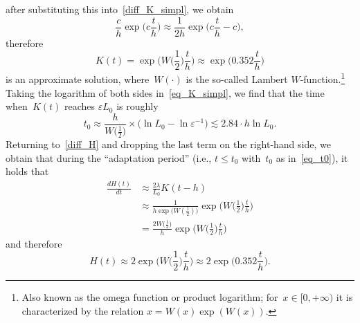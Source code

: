 \documentclass[12pt]{article}
\newcommand{\eps}{\varepsilon}
\begin{document}
after substituting this into~\eqref{diff_K_simpl},
we obtain
\[
 \frac{c}{h}\exp\Big(c\frac{t}{h}\Big) 
   \approx \frac{1}{2h}\exp\Big(c\frac{t}{h}-c\Big),
\]
therefore 
\begin{equation}
\label{eq_K_simpl}
K(t)=\exp\Big(W\big({\textstyle\frac{1}{2}}\big)\frac{t}{h}\Big)
    \approx \exp\Big(0.352\frac{t}{h}\Big)
\end{equation}
is an approximate solution, where~$W(\cdot)$ is the so-called
Lambert $W$-function.\footnote{Also known as
 the omega function or product logarithm; for~$x\in [0,+\infty)$
it is characterized by the relation $x=W(x)\exp(W(x))$.}
Taking the logarithm of both sides in~\eqref{eq_K_simpl}, we find that
the time when~$K(t)$ reaches $\eps L_0$ is roughly
\begin{equation}
 \label{eq_t0}
 t_0 \approx \frac{h}{W\big({\textstyle\frac{1}{2}}\big)} 
\times \big(\ln L_0 - \ln \eps^{-1}\big)
\lesssim 2.84 \cdot h  \ln L_0.
\end{equation}
Returning to~\eqref{diff_H} and 
dropping the last term on the right-hand side, we
obtain that during the ``adaptation period'' (i.e., $t\leq t_0$
with~$t_0$ as in~\eqref{eq_t0}), it holds that
\begin{align*}
 \frac{d H(t)}{dt} &\approx \frac{2\lambda}
{L_0}K(t-h)
  \\
&\approx \frac{1}{h\exp\big(W(\frac{1}{2})\big)}
\exp\Big(W\big({\textstyle\frac{1}{2}}\big)\frac{t}{h}\Big)
\\
&= \frac{2W\big({\textstyle\frac{1}{2}}\big)}{h}
\exp\Big(W\big({\textstyle\frac{1}{2}}\big)\frac{t}{h}\Big)
\end{align*}
and therefore
\begin{equation}
\label{eq_H}
 H(t)\approx 
2\exp\Big(W\big({\textstyle\frac{1}{2}}\big)\frac{t}{h}\Big)
\approx 2\exp\Big(0.352\frac{t}{h}\Big).
\end{equation}
\end{document}
